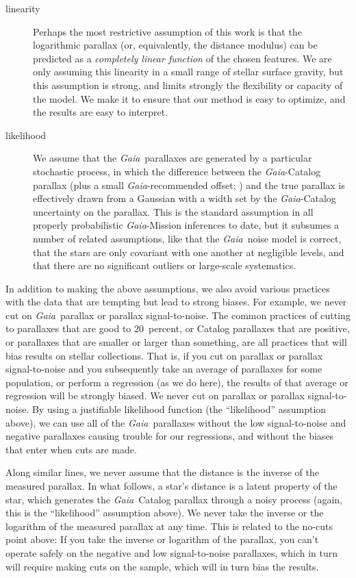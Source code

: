 \documentclass[modern]{aastex62}
\newcommand{\project}[1]{\textsl{#1}}
\newcommand{\gaia}{\project{Gaia}}
\begin{document}
\begin{description}
\item[linearity] Perhaps the most restrictive assumption of this work is that
the logarithmic parallax (or, equivalently, the distance modulus) 
can be predicted as a \emph{completely linear function} of
the chosen features. We are only assuming this linearity in a small range of stellar
surface gravity, but this assumption is strong, and limits strongly the
flexibility or capacity of the model.
We make it to ensure that our method is easy to optimize, and the results are easy
to interpret.

\item[likelihood] We assume that the \gaia\ parallaxes are generated by a particular
stochastic process, in which the difference between the \gaia-Catalog parallax (plus
a small \gaia-recommended offset; \citealt{lindegren}) and the true parallax is effectively drawn from a
Gaussian with a width set by the \gaia-Catalog uncertainty on the parallax.
This is the standard assumption in all properly probabilistic \gaia-Mission inferences
to date, but it subsumes a number of related assumptions, like that the \gaia\ noise
model is correct, that the stars are only covariant with one another at negligible levels, and that
there are no significant outliers or large-scale systematics.
\end{description}

In addition to making the above assumptions, we also avoid various practices
with the data that are tempting but lead to strong biases.
For example, we never cut on \gaia\ parallax or parallax signal-to-noise.
The common practices of cutting to parallaxes that are good to 20~percent,
or Catalog parallaxes that are positive, or parallaxes that are smaller or
larger than something, are all practices that will bias results on stellar
collections.
That is, if you cut on parallax or parallax signal-to-noise and you subsequently
take an average of parallaxes for some population, or perform a regression (as we
do here), the results of that average or regression will be strongly biased.
We never cut on parallax or parallax signal-to-noise.
By using a justifiable likelihood function (the ``likelihood'' assumption above),
we can use all of the \gaia\ parallaxes without the low signal-to-noise and
negative parallaxes causing trouble for our regressions, and without the biases
that enter when cuts are made.

Along similar lines, we never assume that the distance is the inverse of the
measured parallax.
In what follows, a star's distance is a latent property of the star, which generates
the \gaia\ Catalog parallax through a noisy process (again, this is
the ``likelihood'' assumption above).
We never take the inverse or the logarithm of the measured parallax at any time.
This is related to the no-cuts point above:
If you take the inverse or logarithm of the parallax, you can't operate safely
on the negative and low signal-to-noise parallaxes, which in turn will require
making cuts on the sample, which will in turn bias the results.
\end{document}
